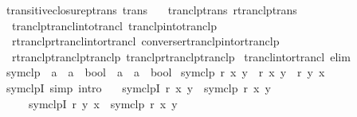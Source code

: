 \begin{isabellebody}
\isanewline
{}\isamarkupfalse%
\ transitive{\isacharunderscore}{\kern0pt}closurep{\isacharunderscore}{\kern0pt}trans{\isacharprime}{\kern0pt}\ {\isacharbrackleft}{\kern0pt}trans{\isacharbrackright}{\kern0pt}\ {\isacharequal}{\kern0pt}\isanewline
\ \ tranclp{\isacharunderscore}{\kern0pt}trans\ rtranclp{\isacharunderscore}{\kern0pt}trans\isanewline
\ \ tranclp{\isachardot}{\kern0pt}trancl{\isacharunderscore}{\kern0pt}into{\isacharunderscore}{\kern0pt}trancl\ tranclp{\isacharunderscore}{\kern0pt}into{\isacharunderscore}{\kern0pt}tranclp{}\isanewline
\ \ rtranclp{\isachardot}{\kern0pt}rtrancl{\isacharunderscore}{\kern0pt}into{\isacharunderscore}{\kern0pt}rtrancl\ converse{\isacharunderscore}{\kern0pt}rtranclp{\isacharunderscore}{\kern0pt}into{\isacharunderscore}{\kern0pt}rtranclp\isanewline
\ \ rtranclp{\isacharunderscore}{\kern0pt}tranclp{\isacharunderscore}{\kern0pt}tranclp\ tranclp{\isacharunderscore}{\kern0pt}rtranclp{\isacharunderscore}{\kern0pt}tranclp\isanewline
\isanewline
{}\isamarkupfalse%
\ trancl{\isacharunderscore}{\kern0pt}into{\isacharunderscore}{\kern0pt}rtrancl\ {\isacharbrackleft}{\kern0pt}elim{\isacharbrackright}{\kern0pt}%
\isadelimdocument
%
\endisadelimdocument
%
\isatagdocument
%
\isamarkuptrue%
%
\endisatagdocument
{\isafolddocument}%
%
\isadelimdocument
%
\endisadelimdocument
{}\isamarkupfalse%
\ symclp\ {\isacharcolon}{\kern0pt}{\isacharcolon}{\kern0pt}\ {\isachardoublequoteopen}{\isacharparenleft}{\kern0pt}{\isacharprime}{\kern0pt}a\ {\isasymRightarrow}\ {\isacharprime}{\kern0pt}a\ {\isasymRightarrow}\ bool{\isacharparenright}{\kern0pt}\ {\isasymRightarrow}\ {\isacharprime}{\kern0pt}a\ {\isasymRightarrow}\ {\isacharprime}{\kern0pt}a\ {\isasymRightarrow}\ bool{\isachardoublequoteclose}\isanewline
{}\ {\isachardoublequoteopen}symclp\ r\ x\ y\ {\isasymlongleftrightarrow}\ r\ x\ y\ {\isasymor}\ r\ y\ x{\isachardoublequoteclose}\isanewline
\isanewline
{}\isamarkupfalse%
\ symclpI\ {\isacharbrackleft}{\kern0pt}simp{\isacharcomma}{\kern0pt}\ intro{\isacharquery}{\kern0pt}{\isacharbrackright}{\kern0pt}{\isacharcolon}{\kern0pt}\isanewline
\ \ \ symclpI{}{\isacharcolon}{\kern0pt}\ {\isachardoublequoteopen}r\ x\ y\ {\isasymLongrightarrow}\ symclp\ r\ x\ y{\isachardoublequoteclose}\isanewline
\ \ \ \ \ symclpI{}{\isacharcolon}{\kern0pt}\ {\isachardoublequoteopen}r\ y\ x\ {\isasymLongrightarrow}\ symclp\ r\ x\ y{\isachardoublequoteclose}\isanewline

\end{isabellebody}
